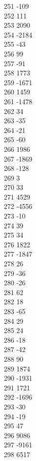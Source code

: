 { 251	-109 \\
 252	111 \\
 253	2090 \\
 254	-2184 \\
 255	-43 \\
 256	99 \\
 257	-91 \\
 258	1773 \\
 259	-1671 \\
 260	1459 \\
 261	-1478 \\
 262	34 \\
 263	-35 \\
 264	-21 \\
 265	-60 \\
 266	1986 \\
 267	-1869 \\
 268	-128 \\
 269	3 \\
 270	33 \\
 271	4529 \\
 272	-4556 \\
 273	-10 \\
 274	39 \\
 275	34 \\
 276	1822 \\
 277	-1847 \\
 278	26 \\
 279	-36 \\
 280	-26 \\
 281	62 \\
 282	18 \\
 283	-65 \\
 284	29 \\
 285	24 \\
 286	-18 \\
 287	-42 \\
 288	90 \\
 289	1874 \\
 290	-1931 \\
 291	1721 \\
 292	-1696 \\
 293	-30 \\
 294	-19 \\
 295	47 \\
 296	9086 \\
 297	-9161 \\
 298	6517 \\
}
